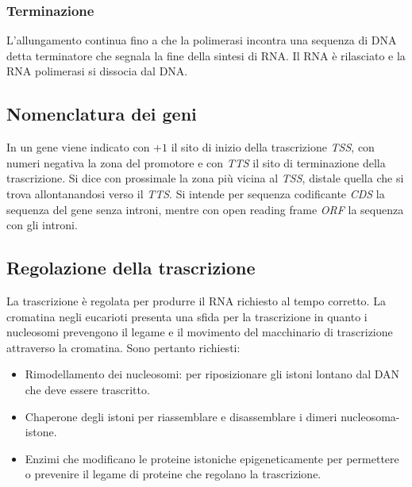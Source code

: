 \subsubsection{Terminazione}
L'allungamento continua fino a che la polimerasi incontra una sequenza di DNA detta terminatore che segnala la fine della sintesi di RNA. Il RNA \`e rilasciato e la RNA polimerasi si 
dissocia dal DNA. 
\subsection{Nomenclatura dei geni}
In un gene viene indicato con $+1$ il sito di inizio della trascrizione \emph{TSS}, con numeri negativa la zona del promotore e con \emph{TTS} il sito di terminazione della trascrizione.
Si dice con prossimale la zona pi\`u vicina al \emph{TSS}, distale quella che si trova allontanandosi verso il \emph{TTS}. Si intende per sequenza codificante \emph{CDS} la sequenza del 
gene senza introni, mentre con open reading frame \emph{ORF} la sequenza con gli introni. 
\subsection{Regolazione della trascrizione}
La trascrizione \`e regolata per produrre il RNA richiesto al tempo corretto. La cromatina negli eucarioti presenta una sfida per la trascrizione in quanto i nucleosomi prevengono
il legame e il movimento del macchinario di trascrizione attraverso la cromatina. Sono pertanto richiesti:
\begin{itemize}
	\item Rimodellamento dei nucleosomi: per riposizionare gli istoni lontano dal DAN che deve essere trascritto. 
	\item Chaperone degli istoni per riassemblare e disassemblare i dimeri nucleosoma-istone.
	\item Enzimi che modificano le proteine istoniche epigeneticamente per permettere o prevenire il legame di proteine che regolano la trascrizione.
\end{itemize}
